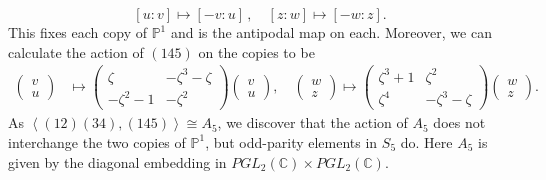 \documentclass{amsart}
\newcommand{\pangle}[1]{\left\langle #1 \right\rangle}
\begin{document}
\[
[u:v] \mapsto [-v:u] \, , \quad [z:w] \mapsto [-w:z]  . 
\]
This fixes each copy of $\mathbb{P}^1$ and is the antipodal map on each. 
Moreover, we can calculate the action of $(145)$ on the copies to be 
\begin{align}\label{can145}
    \begin{pmatrix}
    v \\ u
    \end{pmatrix} &\mapsto \begin{pmatrix}
    \zeta & -\zeta^3-\zeta \\ -\zeta^2-1 & -\zeta^2
    \end{pmatrix} \begin{pmatrix}
    v \\ u
    \end{pmatrix}, \quad
    \begin{pmatrix}
    w \\ z
    \end{pmatrix} \mapsto \begin{pmatrix}
    \zeta^3+1 & \zeta^2 \\ \zeta^4 & -\zeta^3-\zeta
    \end{pmatrix}\begin{pmatrix}
    w \\ z
    \end{pmatrix} . 
\end{align}
As $\pangle{(12)(34), (145)} \cong A_5$, we discover that the action of $A_5$ does not interchange the two copies of $\mathbb{P}^1$, but odd-parity elements in $S_5$ do. Here $A_5$ is given by the diagonal embedding in $PGL_2(\mathbb{C}) \times PGL_2( \mathbb{C})$. 
\end{document}
